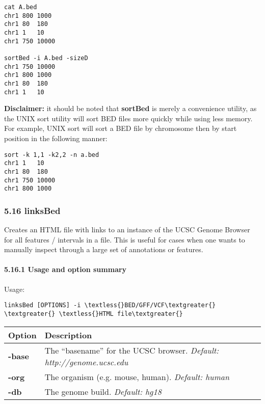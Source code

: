 \documentclass[letterpaper,10pt,english]{sphinxmanual}
\begin{document}
\begin{Verbatim}[commandchars=\\\{\}]
cat A.bed
chr1 800 1000
chr1 80  180
chr1 1   10
chr1 750 10000

sortBed -i A.bed -sizeD
chr1 750 10000
chr1 800 1000
chr1 80  180
chr1 1   10
\end{Verbatim}

\textbf{Disclaimer:} it should be noted that \textbf{sortBed} is merely a convenience utility, as the UNIX sort utility
will sort BED files more quickly while using less memory. For example, UNIX sort will sort a BED file
by chromosome then by start position in the following manner:

\begin{Verbatim}[commandchars=\\\{\}]
sort -k 1,1 -k2,2 -n a.bed
chr1 1   10
chr1 80  180
chr1 750 10000
chr1 800 1000
\end{Verbatim}


\subsubsection{5.16 linksBed}
\label{content/linksBed:linksbed}\label{content/linksBed::doc}
Creates an HTML file with links to an instance of the UCSC Genome Browser for all features /
intervals in a file. This is useful for cases when one wants to manually inspect through a large set of
annotations or features.


\paragraph{5.16.1 Usage and option summary}
\label{content/linksBed:usage-and-option-summary}
Usage:

\begin{Verbatim}[commandchars=\\\{\}]
linksBed [OPTIONS] -i \textless{}BED/GFF/VCF\textgreater{} \textgreater{} \textless{}HTML file\textgreater{}
\end{Verbatim}

\begin{tabulary}{\linewidth}{|L|L|}
\hline
\textbf{
Option
} & \textbf{
Description
}\\\hline

\textbf{-base}
 & 
The ``basename'' for the UCSC browser. \emph{Default: http://genome.ucsc.edu}
\\\hline

\textbf{-org}
 & 
The organism (e.g. mouse, human). \emph{Default: human}
\\\hline

\textbf{-db}
 & 
The genome build. \emph{Default: hg18}
\\\hline
\end{tabulary}
\end{document}
